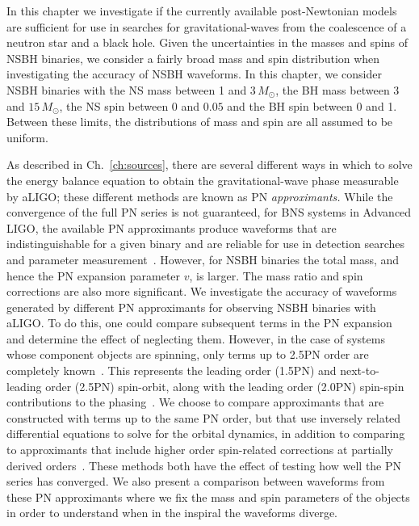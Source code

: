 In this chapter we investigate if the currently available post-Newtonian models
are sufficient for use in searches for gravitational-waves from the
coalescence of a neutron star and a black hole. Given the uncertainties in the masses and spins of
\ac{NSBH} binaries, we consider a fairly broad mass and spin
distribution when investigating the accuracy of \ac{NSBH} waveforms.
In this chapter, we consider \ac{NSBH} binaries with the \ac{NS} mass between 1
and $3\, M_\odot$, the \ac{BH} mass between $3$ and $15\, M_\odot$, the
\ac{NS} spin between 0 and $0.05$ and the
\ac{BH} spin between 0 and 1. Between these limits, the distributions of mass and spin are all
assumed to be uniform. 


As described in Ch.~\ref{ch:sources}, there are several different ways in which to solve the energy balance equation
to obtain the gravitational-wave phase measurable by aLIGO; these different methods are known as
\ac{PN} \emph{approximants.} While the convergence of the full \ac{PN} series 
is not guaranteed, for \ac{BNS} systems in Advanced LIGO, the
available \ac{PN} approximants produce waveforms that are indistinguishable for
a given binary and are reliable for use in detection searches and parameter
measurement~\cite{Simone:1996db,Buonanno:2009zt,Brown:2012qf}. However, for \ac{NSBH}
binaries the total mass, and hence the \ac{PN} expansion parameter $v$, is
larger. The mass ratio and spin corrections are also more significant. 
We investigate the accuracy of 
waveforms generated by different \ac{PN} approximants for observing \ac{NSBH}
binaries with aLIGO.
To do this, one could compare subsequent terms in the \ac{PN} expansion and
determine the effect of neglecting them. However, in the case of systems whose
component objects are spinning, only terms up to 2.5\ac{PN} order are
completely known~\cite{Kidder:1992fr,Kidder:1995zr,Arun:2008kb}. 
This represents the leading order (1.5\ac{PN}) and
next-to-leading order (2.5\ac{PN}) spin-orbit, along with the leading order
(2.0\ac{PN}) spin-spin contributions to the phasing~\cite{Kidder:1992fr,Kidder:1995zr,Arun:2008kb}.  
We choose to compare approximants that are constructed with terms up to the same
\ac{PN} order, but that use inversely related differential equations to solve
for the orbital dynamics, in addition to comparing to approximants that include
higher order spin-related corrections at partially derived orders~\cite{Bohe:2013cla, Blanchet:2011zv}.
These methods both have the effect of testing
how well the \ac{PN} series has converged. We also present a comparison between
waveforms from these \ac{PN} approximants where we fix the mass and spin
parameters of the objects in order to understand when in the inspiral the waveforms diverge.

